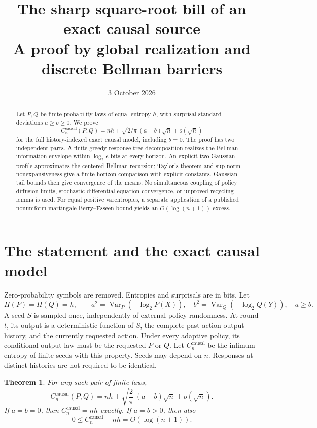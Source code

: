 \documentclass[11pt,a4paper]{article}
\title{The sharp square-root bill of an exact causal source\\[4pt]
\large A proof by global realization and discrete Bellman barriers}
\author{}
\date{3 October 2026}
\newtheorem{theorem}{Theorem}
\newcommand{\causal}{\mathrm{causal}}
\begin{document}
\maketitle
\begin{abstract}
Let $P,Q$ be finite probability laws of equal entropy $h$, with
surprisal standard deviations $a\ge b\ge0$. We prove
\[
C_n^{\causal}(P,Q)=nh+\sqrt{2/\pi}\,(a-b)\sqrt n+o(\sqrt n)
\]
for the full history-indexed exact causal model, including $b=0$.
The proof has two independent parts. A finite greedy response-tree
decomposition realizes the Bellman information envelope within
$\log_2 e$ bits at every horizon. An explicit two-Gaussian profile
approximates the centered Bellman recursion; Taylor's theorem and
sup-norm nonexpansiveness give a finite-horizon comparison with explicit
constants. Gaussian tail bounds then give convergence of the means.
No simultaneous coupling of policy diffusion limits, stochastic
differential equation convergence, or unproved recycling lemma is used.
For equal positive varentropies, a separate application of a published
nonuniform martingale Berry--Esseen bound yields an $O(\log(n+1))$ excess.
\end{abstract}

\section{The statement and the exact causal model}
Zero-probability symbols are removed. Entropies and surprisals are in
bits. Let
\[
H(P)=H(Q)=h,\qquad
a^2=\operatorname{Var}_P(-\log_2P(X)),\quad
b^2=\operatorname{Var}_Q(-\log_2Q(Y)),\quad a\ge b.
\]
A seed $S$ is sampled once, independently of external policy randomness.
At round $t$, its output is a deterministic function of $S$, the complete
past action-output history, and the currently requested action. Under
every adaptive policy, its conditional output law must be the requested
$P$ or $Q$. Let $C_n^{\causal}$ be the infimum entropy of finite seeds
with this property. Seeds may depend on $n$. Responses at distinct
histories are not required to be identical.

\begin{theorem}\label{thm:main}
For any such pair of finite laws,
\begin{equation}\label{eq:main}
\boxed{C_n^{\causal}(P,Q)
=nh+\sqrt{\frac2\pi}\,(a-b)\sqrt n+o(\sqrt n).}
\end{equation}
If $a=b=0$, then $C_n^{\causal}=nh$ exactly. If $a=b>0$, then also
\begin{equation}\label{eq:equalvar}
0\le C_n^{\causal}-nh=O(\log(n+1)).
\end{equation}
\end{theorem}
\end{document}
